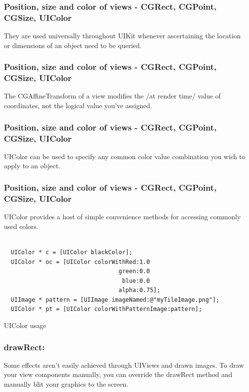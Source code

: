 \documentclass[10pt]{beamer}
\begin{document}
\begin{frame}[fragile]
  \frametitle{Position, size and color of views - CGRect, CGPoint, CGSize, UIColor}
  They are used universally throughout UIKit whenever ascertaining the location or dimensions of an object need to be queried.

\end{frame}

\begin{frame}[fragile]
  \frametitle{Position, size and color of views - CGRect, CGPoint, CGSize, UIColor}
  The CGAffineTransform of a view modifies the /at render time/ value of coordinates, not the logical value you've assigned.

\end{frame}

\begin{frame}[fragile]
  \frametitle{Position, size and color of views - CGRect, CGPoint, CGSize, UIColor}
  UIColor can be used to specify any common color value combination you wish to apply to an object.

\end{frame}

\begin{frame}[fragile]
  \frametitle{Position, size and color of views - CGRect, CGPoint, CGSize, UIColor}
  UIColor provides a host of simple convenience methods for accessing commonly used colors.
\begin{listing}[H]
    \begin{verbatim}

  UIColor * c = [UIColor blackColor];
  UIColor * oc = [UIColor colorWithRed:1.0
                                 green:0.0
                                  blue:0.0
                                 alpha:0.75];
  UIImage * pattern = [UIImage imageNamed:@"myTileImage.png"];
  UIColor * pt = [UIColor colorWithPatternImage:pattern];

  \end{verbatim}
    \caption{UIColor usage}
    \label{listing:32}
  \end{listing}

\end{frame}

    
\begin{frame}[fragile]
  \frametitle{drawRect:}
  Some effects aren't easily achieved through UIViews and drawn images.  To draw your view components manually, you can override the drawRect method and manually blit your graphics to the screen.

\end{frame}
\end{document}
